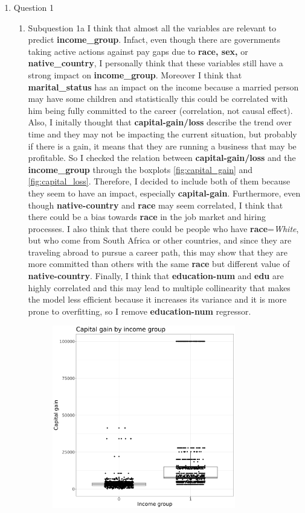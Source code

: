 \documentclass[12pt,twoside]{article}
\begin{document}
\pagebreak
\begin{enumerate}

\item Question 1

\begin{enumerate}
	\item Subquestion 1a
	I think that almost all the variables are relevant to predict \textbf{income\_group}. Infact, even though there are governments taking active actions against pay gaps due to \textbf{race, sex,} or \textbf{native\_country}, I personally think that these variables still have a strong impact on \textbf{income\_group}.
	Moreover I think that \textbf{marital\_status} has an impact on the income because a married person may have some children and statistically this could be correlated with him being fully committed to the career (correlation, not causal effect).
	Also, I initally thought that  \textbf{capital-gain/loss} describe the trend over time and they may not be impacting the current situation, but probably if there is a gain, it means that they are running a business that may be profitable. So I checked the relation between \textbf{capital-gain/loss} and the \textbf{income\_group} through the boxplots \ref{fig:capital_gain} and \ref{fig:capital_loss}. Therefore, I decided to include both of them because they seem to have an impact, especially \textbf{capital-gain}.
	Furthermore, even though \textbf{native-country} and \textbf{race} may seem correlated, I think that there could be a bias towards \textbf{race} in the job market and hiring processes. I also think that there could be people who have \textbf{race}=\textit{White}, but who come from South Africa or other countries, and since they are traveling abroad to pursue a career path, this may show that they are more committed than others with the same \textbf{race} but different value of \textbf{native-country}.
	Finally, I think that \textbf{education-num} and \textbf{edu} are highly correlated and this may lead to multiple collinearity that makes the model less efficient because it increases its variance and it is more prone to overfitting, so I remove \textbf{education-num} regressor.
	\begin{figure}[H]\centering
		\includegraphics[width=8cm]{capital_gain}

\end{figure}
\end{enumerate}
\end{enumerate}
\end{document}
